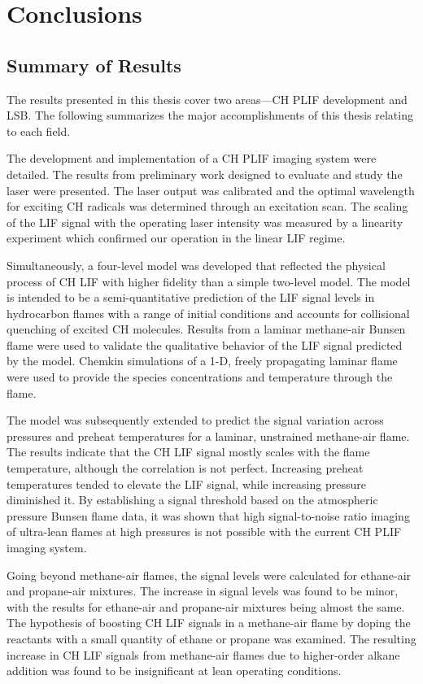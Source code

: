\chapter{Conclusions}
\label{ch:conclusions}

\section{Summary of Results}

The results presented in this thesis cover two areas---CH PLIF development and LSB.
The following summarizes the major accomplishments of this thesis relating to each field.

The development and implementation of a CH PLIF imaging system were detailed.
The results from preliminary work designed to evaluate and study the laser were presented.
The laser output was calibrated and the optimal wavelength for exciting CH radicals was determined through an excitation scan.
The scaling of the LIF signal with the operating laser intensity was measured by a linearity experiment which confirmed our operation in the linear LIF regime.

Simultaneously, a four-level model was developed that reflected the physical process of CH LIF with higher fidelity than a simple two-level model.
The model is intended to be a semi-quantitative prediction of the LIF signal levels in hydrocarbon flames with a range of initial conditions and accounts for collisional quenching of excited CH molecules.
Results from a laminar methane-air Bunsen flame were used to validate the qualitative behavior of the LIF signal predicted by the model.
Chemkin simulations of a 1-D, freely propagating laminar flame were used to provide the species concentrations and temperature through the flame.

The model was subsequently extended to predict the signal variation across pressures and preheat temperatures for a laminar, unstrained methane-air flame.
The results indicate that the CH LIF signal mostly scales with the flame temperature, although the correlation is not perfect.
Increasing preheat temperatures tended to elevate the LIF signal, while increasing pressure diminished it.
By establishing a signal threshold based on the atmospheric pressure Bunsen flame data, it was shown that high signal-to-noise ratio imaging of ultra-lean flames at high pressures is not possible with the current CH PLIF imaging system.

Going beyond methane-air flames, the signal levels were calculated for ethane-air and propane-air mixtures.
The increase in signal levels was found to be minor, with the results for ethane-air and propane-air mixtures being almost the same.
The hypothesis of boosting CH LIF signals in a methane-air flame by doping the reactants with a small quantity of ethane or propane was examined.
The resulting increase in CH LIF signals from methane-air flames due to higher-order alkane addition was found to be insignificant at lean operating conditions.

